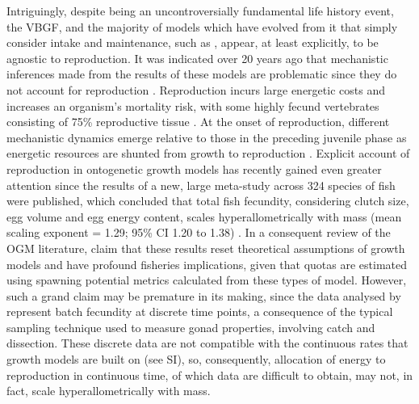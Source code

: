 \documentclass[a4paper]{article} %
\begin{document}
    Intriguingly, despite being an uncontroversially fundamental life history event, the VBGF, and the majority of models which have evolved from it that simply consider intake and maintenance, such as \cite{West2001}, appear, at least explicitly, to be agnostic to reproduction. It was indicated over 20 years ago that mechanistic inferences made from the results of these models are problematic since they do not account for reproduction \autocite{Day1997, Marshall2019b}. Reproduction incurs large energetic costs and increases an organism's mortality risk, with some highly fecund vertebrates consisting of 75\% reproductive tissue \autocite{Parker2018}. At the onset of reproduction, different mechanistic dynamics emerge relative to those in the preceding juvenile phase as energetic resources are shunted from growth to reproduction \autocite{Day1997}. Explicit account of reproduction in ontogenetic growth models has recently gained even greater attention since the results of a new, large meta-study across 324 species of fish were published, which concluded that total fish fecundity, considering clutch size, egg volume and egg energy content, scales hyperallometrically with mass (mean scaling exponent = 1.29; 95\% CI 1.20 to 1.38) \autocite{Barneche2018d}. In a consequent review of the OGM literature, \cite{Marshall2019b} claim that these results reset theoretical assumptions of growth models and have profound fisheries implications, given that quotas are estimated using spawning potential metrics calculated from these types of model. However, such a grand claim may be premature in its making, since the data analysed by \cite{Barneche2018d} represent batch fecundity at discrete time points, a consequence of the typical sampling technique used to measure gonad properties, involving catch and dissection. These discrete data are not compatible with the continuous rates that growth models are built on (see SI), so, consequently, allocation of energy to reproduction in continuous time, of which data are difficult to obtain, may not, in fact, scale hyperallometrically with mass.
    
\end{document}
